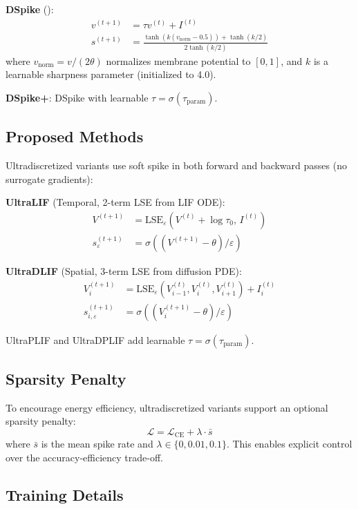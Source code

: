 \documentclass{article}
\theoremstyle{plain}
\theoremstyle{definition}
\theoremstyle{remark}
\newcommand{\lse}{\mathrm{LSE}}
\newcommand{\eps}{\varepsilon}
\begin{document}
\textbf{DSpike} (\citealp{li2021differentiable}):
\begin{align}
v^{(t+1)} &= \tau v^{(t)} + I^{(t)} \\
s^{(t+1)} &= \frac{\tanh(k(v_{\text{norm}} - 0.5)) + \tanh(k/2)}{2\tanh(k/2)}
\end{align}
where $v_{\text{norm}} = v / (2\theta)$ normalizes membrane potential to $[0, 1]$, and $k$ is a learnable sharpness parameter (initialized to 4.0).

\textbf{DSpike+}: DSpike with learnable $\tau = \sigma(\tau_{\text{param}})$.

\subsection{Proposed Methods}

Ultradiscretized variants use soft spike in both forward and backward passes (no surrogate gradients):

\textbf{UltraLIF} (Temporal, 2-term LSE from LIF ODE):
\begin{align}
V^{(t+1)} &= \lse_\eps(V^{(t)} + \log\tau_0, \, I^{(t)}) \\
s_\eps^{(t+1)} &= \sigma((V^{(t+1)} - \theta) / \eps)
\end{align}

\textbf{UltraDLIF} (Spatial, 3-term LSE from diffusion PDE):
\begin{align}
V_i^{(t+1)} &= \lse_\eps(V_{i-1}^{(t)}, V_i^{(t)}, V_{i+1}^{(t)}) + I_i^{(t)} \\
s_{i,\eps}^{(t+1)} &= \sigma((V_i^{(t+1)} - \theta) / \eps)
\end{align}

UltraPLIF and UltraDPLIF add learnable $\tau = \sigma(\tau_{\text{param}})$.

\subsection{Sparsity Penalty}

To encourage energy efficiency, ultradiscretized variants support an optional sparsity penalty:
\begin{equation}
\mathcal{L} = \mathcal{L}_\text{CE} + \lambda \cdot \bar{s}
\end{equation}
where $\bar{s}$ is the mean spike rate and $\lambda \in \{0, 0.01, 0.1\}$. This enables explicit control over the accuracy-efficiency trade-off.

\subsection{Training Details}
\end{document}
